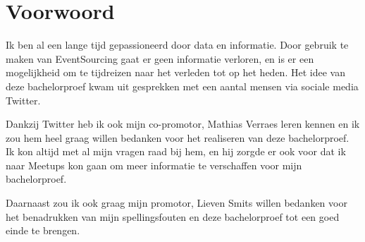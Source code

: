 
\chapter*{Voorwoord}
\label{ch:voorwoord}


Ik ben al een lange tijd gepassioneerd door data en informatie. Door gebruik te maken van EventSourcing gaat er geen informatie verloren, en is er een mogelijkheid om te tijdreizen naar het verleden tot op het heden. Het idee van deze bachelorproef kwam uit gesprekken met een aantal mensen via sociale media Twitter.

Dankzij Twitter heb ik ook mijn co-promotor, Mathias Verraes leren kennen en ik zou hem heel graag willen bedanken voor het realiseren van deze bachelorproef. Ik kon altijd met al mijn vragen raad bij hem, en hij zorgde er ook voor dat ik naar Meetups kon gaan om meer informatie te verschaffen voor mijn bachelorproef.

Daarnaast zou ik ook graag mijn promotor, Lieven Smits willen bedanken voor het benadrukken van mijn spellingsfouten en deze bachelorproef tot een goed einde te brengen.